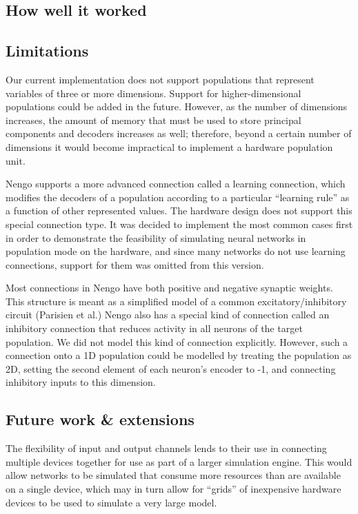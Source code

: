 \documentclass[english]{article}
\begin{document}
\subsection{How well it worked}

\subsection{Limitations}

Our current implementation does not support populations that represent variables of three or more dimensions.
Support for higher-dimensional populations could be added in the future.
However, as the number of dimensions increases, the
amount of memory that must be used to store principal components and
decoders increases as well; therefore, beyond a certain number of
dimensions it would become impractical to implement a hardware
population unit.  

Nengo supports a more advanced connection called a learning connection,
which modifies the decoders of a population according to a particular ``learning rule''
as a function of other represented values. The hardware design does not support this special connection type.
It was decided to implement the most common cases first in order to demonstrate the feasibility of simulating
neural networks in population mode on the hardware, and since many networks do not use learning connections,
support for them was omitted from this version.

Most connections in Nengo have both positive and negative synaptic weights. This
structure is meant as a simplified model of a common excitatory/inhibitory circuit
(Parisien et al.) %
Nengo also has a special kind of connection called an inhibitory connection that
reduces activity in all neurons of the target population. We did not model this kind of connection explicitly.
However, such a connection onto a 1D population could be modelled by treating the population as 2D,
setting the second element of each neuron's encoder to -1, and connecting inhibitory inputs to this dimension.


\subsection{Future work \& extensions}


The flexibility of input and output channels lends to their use in connecting multiple devices together for use as part of a larger simulation engine.
This would allow networks to be simulated that consume more resources than are available on a single device, which may in turn allow
for ``grids'' of inexpensive hardware devices to be used to simulate a very large model.
\end{document}
